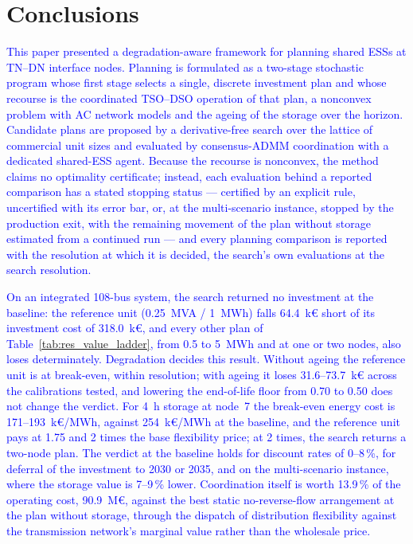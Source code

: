 \documentclass[preprint,12pt]{elsarticle}
\begin{document}
\section{Conclusions}
\label{sec:conclusions}

\textcolor{blue}{
    This paper presented a degradation-aware framework for planning shared ESSs at TN--DN interface nodes. Planning is formulated as a two-stage stochastic program whose first stage selects a single, discrete investment plan and whose recourse is the coordinated TSO--DSO operation of that plan, a nonconvex problem with AC network models and the ageing of the storage over the horizon. Candidate plans are proposed by a derivative-free search over the lattice of commercial unit sizes and evaluated by consensus-ADMM coordination with a dedicated shared-ESS agent. Because the recourse is nonconvex, the method claims no optimality certificate; instead, each evaluation behind a reported comparison has a stated stopping status --- certified by an explicit rule, uncertified with its error bar, or, at the multi-scenario instance, stopped by the production exit, with the remaining movement of the plan without storage estimated from a continued run --- and every planning comparison is reported with the resolution at which it is decided, the search's own evaluations at the search resolution.
}

\textcolor{blue}{
    On an integrated 108-bus system, the search returned no investment at the baseline: the reference unit (0.25~MVA / 1~MWh) falls 64.4~k\euro{} short of its investment cost of 318.0~k\euro{}, and every other plan of Table~\ref{tab:res_value_ladder}, from 0.5 to 5~MWh and at one or two nodes, also loses determinately. Degradation decides this result. Without ageing the reference unit is at break-even, within resolution; with ageing it loses 31.6--73.7~k\euro{} across the calibrations tested, and lowering the end-of-life floor from 0.70 to 0.50 does not change the verdict. For 4~h storage at node~7 the break-even energy cost is 171--193~k\euro/MWh, against 254~k\euro/MWh at the baseline, and the reference unit pays at 1.75 and 2 times the base flexibility price; at 2 times, the search returns a two-node plan. The verdict at the baseline holds for discount rates of 0--8\,\%, for deferral of the investment to 2030 or 2035, and on the multi-scenario instance, where the storage value is 7--9\,\% lower. Coordination itself is worth 13.9\,\% of the operating cost, 90.9~M\euro{}, against the best static no-reverse-flow arrangement at the plan without storage, through the dispatch of distribution flexibility against the transmission network's marginal value rather than the wholesale price.
}
\end{document}
